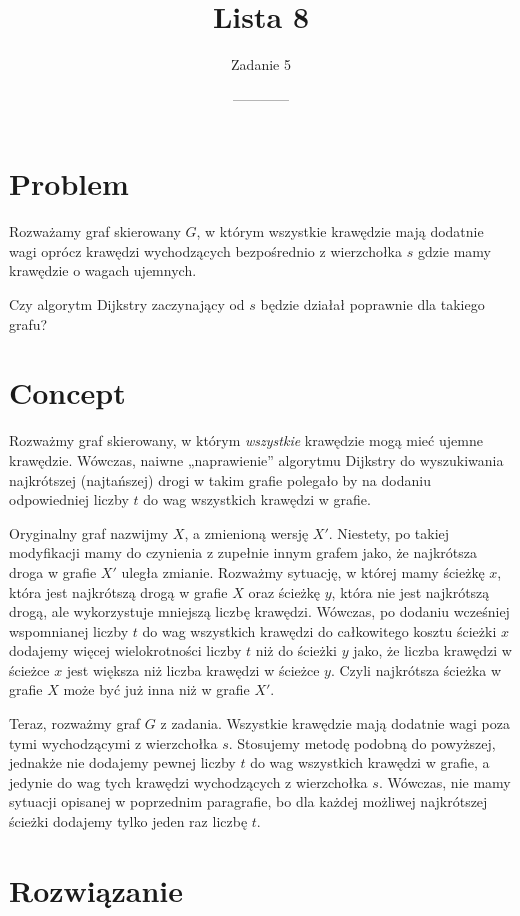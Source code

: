 \documentclass[14pt]{article}
\title{Lista 8}
\author{Zadanie 5}
\date{------------}
\begin{document}
\maketitle

\section{Problem}

Rozważamy graf skierowany $G$, w którym wszystkie krawędzie mają dodatnie wagi oprócz krawędzi wychodzących bezpośrednio z wierzchołka $s$ gdzie mamy krawędzie o wagach ujemnych.

Czy algorytm Dijkstry zaczynający od $s$ będzie działał poprawnie dla takiego grafu?

\section{Concept}

Rozważmy graf skierowany, w którym \textit{wszystkie} krawędzie mogą mieć ujemne krawędzie. Wówczas, naiwne „naprawienie” algorytmu Dijkstry do wyszukiwania najkrótszej (najtańszej) drogi w takim grafie polegało by na dodaniu odpowiedniej liczby $t$ do wag wszystkich krawędzi w grafie.

Oryginalny graf nazwijmy $X$, a zmienioną wersję $X'$. Niestety, po takiej modyfikacji mamy do czynienia z zupełnie innym grafem jako, że najkrótsza droga w grafie $X'$ uległa zmianie. Rozważmy sytuację, w której mamy ścieżkę $x$, która jest najkrótszą drogą w grafie $X$ oraz ścieżkę $y$, która nie jest najkrótszą drogą, ale wykorzystuje mniejszą liczbę krawędzi. Wówczas, po dodaniu wcześniej wspomnianej liczby $t$ do wag wszystkich krawędzi do całkowitego kosztu ścieżki $x$ dodajemy więcej wielokrotności liczby $t$ niż do ścieżki $y$ jako, że liczba krawędzi w ścieżce $x$ jest większa niż liczba krawędzi w ścieżce $y$. Czyli najkrótsza ścieżka w grafie $X$ może być już inna niż w grafie $X'$.

Teraz, rozważmy graf $G$ z zadania. Wszystkie krawędzie mają dodatnie wagi poza tymi wychodzącymi z wierzchołka $s$. Stosujemy metodę podobną do powyższej, jednakże nie dodajemy pewnej liczby $t$ do wag wszystkich krawędzi w grafie, a jedynie do wag tych krawędzi wychodzących z wierzchołka $s$. Wówczas, nie mamy sytuacji opisanej w poprzednim paragrafie, bo dla każdej możliwej najkrótszej ścieżki dodajemy tylko jeden raz liczbę $t$.

\section{Rozwiązanie}
\end{document}
